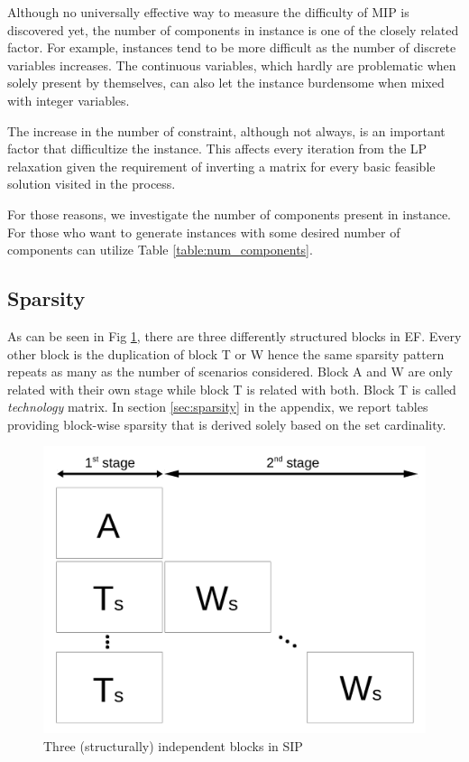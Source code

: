 Although no universally effective way to measure the difficulty of MIP is discovered yet, the number of components in instance is one of the closely related factor. For example, instances tend to be more difficult as the number of discrete variables increases. The continuous variables, which hardly are problematic when solely present by themselves, can also let the instance burdensome when mixed with integer variables. 

The increase in the number of constraint, although not always, is an important factor that difficultize the instance. This affects every iteration from the LP relaxation given the requirement of inverting a matrix for every basic feasible solution visited in the process.

For those reasons, we investigate the number of components present in instance. For those who want to generate instances with some desired number of components can utilize Table \ref{table:num_components}.



\subsection{Sparsity}
As can be seen in Fig \ref{fig:stagewise_sparsity}, there are three differently structured blocks in EF. Every other block is the duplication of block T or W hence the same sparsity pattern repeats as many as the number of scenarios considered. Block A and W are only related with their own stage while block T is related with both. Block T is called \textit{technology}  matrix. In section \ref{sec:sparsity} in the appendix, we report tables providing block-wise sparsity that is derived solely based on the set cardinality.
\begin{figure}
	\centering
	\includegraphics[width=0.7\linewidth]{drawings/stagewise_sparsity}
	\caption{Three (structurally) independent blocks in SIP}
	\label{fig:stagewise_sparsity}
\end{figure}

